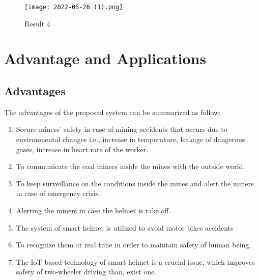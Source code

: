\documentclass[12pt,a4paper]{report}
\begin{document}
\begin{figure}[htp]
    \texttt{[image: 2022-05-26 (1).png]}
    \caption{Result 4}
\end{figure}

\noindent \textbf{}

\noindent \textbf{}

\noindent \textbf{}

\noindent \textbf{}

\noindent \textbf{}

\noindent \textbf{ }
\newpage
\noindent
\noindent 
\noindent
\chapter{Advantage and Applications}
\section{ Advantages}


\noindent The advantages of the proposed system can be summarized as follow:

\begin{enumerate}
\item  Secure miners' safety in case of mining accidents that occurs due to environmental changes i.e., increase in temperature, leakage of dangerous gases, increase in heart rate of the worker.

\item  To communicate the coal miners inside the mines with the outside world.

\item  To keep surveillance on the conditions inside the mines and alert the miners in case of emergency crisis.

\item  Alerting the miners in case the helmet is take off.

\item  The system of smart helmet is utilized to avoid motor bikes accidents 

\item  To recognize them at real time in order to maintain safety of human being. 

\item  The IoT based-technology of smart helmet is a crucial issue, which improves safety of two-wheeler driving than, exist one.
\end{enumerate}

\noindent 
\end{document}
